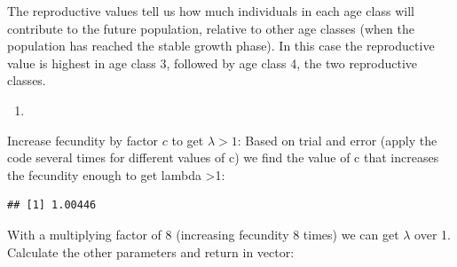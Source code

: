 \documentclass[
]{book}
\newenvironment{Shaded}{\begin{snugshade}}{\end{snugshade}}
\newcommand{\AttributeTok}[1]{\textcolor[rgb]{0.77,0.63,0.00}{#1}}
\newcommand{\CommentTok}[1]{\textcolor[rgb]{0.56,0.35,0.01}{\textit{#1}}}
\newcommand{\DecValTok}[1]{\textcolor[rgb]{0.00,0.00,0.81}{#1}}
\newcommand{\FunctionTok}[1]{\textcolor[rgb]{0.00,0.00,0.00}{#1}}
\newcommand{\NormalTok}[1]{#1}
\newcommand{\OtherTok}[1]{\textcolor[rgb]{0.56,0.35,0.01}{#1}}
\newcommand{\SpecialCharTok}[1]{\textcolor[rgb]{0.00,0.00,0.00}{#1}}
\providecommand{\tightlist}{%
  \setlength{\itemsep}{0pt}\setlength{\parskip}{0pt}}
\begin{document}
The reproductive values tell us how much individuals in each age class will contribute to the future population, relative to other age classes (when the population has reached the stable growth phase). In this case the reproductive value is highest in age class 3, followed by age class 4, the two reproductive classes.

\begin{enumerate}
\def\labelenumi{\arabic{enumi}.}
\setcounter{enumi}{6}
\tightlist
\item
\end{enumerate}

Increase fecundity by factor \(c\) to get \(\lambda>1\): Based on trial and error (apply the code several times for different values of c) we find the value of c that increases the fecundity enough to get lambda \textgreater1:

\begin{Shaded}
\end{Shaded}

\begin{verbatim}
## [1] 1.00446
\end{verbatim}

With a multiplying factor of 8 (increasing fecundity 8 times) we can get \(\lambda\) over 1. Calculate the other parameters and return in vector:
\end{document}
